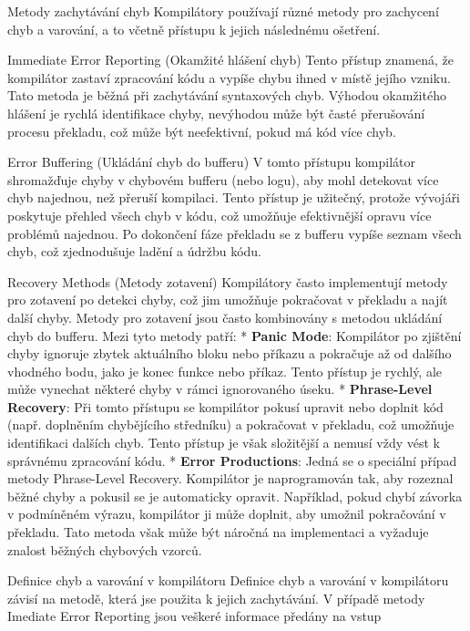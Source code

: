 \sec Metody zachytávání chyb
Kompilátory používají různé metody pro zachycení chyb a varování, a to včetně přístupu k jejich následnému ošetření. 

\secc Immediate Error Reporting (Okamžité hlášení chyb)
Tento přístup znamená, že kompilátor zastaví zpracování kódu a vypíše chybu ihned v místě jejího vzniku. Tato metoda je běžná při zachytávání syntaxových chyb. Výhodou okamžitého hlášení je rychlá identifikace chyby, nevýhodou může být časté přerušování procesu překladu, což může být neefektivní, pokud má kód více chyb.

\secc Error Buffering (Ukládání chyb do bufferu)
V tomto přístupu kompilátor shromažďuje chyby v chybovém bufferu (nebo logu), aby mohl detekovat více chyb najednou, než přeruší kompilaci. Tento přístup je užitečný, protože vývojáři poskytuje přehled všech chyb v kódu, což umožňuje efektivnější opravu více problémů najednou. Po dokončení fáze překladu se z bufferu vypíše seznam všech chyb, což zjednodušuje ladění a údržbu kódu.

\secc Recovery Methods (Metody zotavení)
Kompilátory často implementují metody pro zotavení po detekci chyby, což jim umožňuje pokračovat v překladu a najít další chyby. Metody pro zotavení jsou často kombinovány s metodou ukládání chyb do bufferu. Mezi tyto metody patří:
\begitems
* {\bf Panic Mode}: Kompilátor po zjištění chyby ignoruje zbytek aktuálního bloku nebo příkazu a pokračuje až od dalšího vhodného bodu, jako je konec funkce nebo příkaz. Tento přístup je rychlý, ale může vynechat některé chyby v rámci ignorovaného úseku.
* {\bf Phrase-Level Recovery}: Při tomto přístupu se kompilátor pokusí upravit nebo doplnit kód (např. doplněním chybějícího středníku) a pokračovat v překladu, což umožňuje identifikaci dalších chyb. Tento přístup je však složitější a nemusí vždy vést k správnému zpracování kódu.
* {\bf Error Productions}: Jedná se o speciální případ metody Phrase-Level Recovery. Kompilátor je naprogramován tak, aby rozeznal běžné chyby a pokusil se je automaticky opravit. Například, pokud chybí závorka v podmíněném výrazu, kompilátor ji může doplnit, aby umožnil pokračování v překladu. Tato metoda však může být náročná na implementaci a vyžaduje znalost běžných chybových vzorců.
\enditems

\sec Definice chyb a varování v kompilátoru
Definice chyb a varování v kompilátoru závisí na metodě, která jse použita k jejich zachytávání. V případě metody Imediate Error Reporting jsou veškeré informace předány na vstup 







